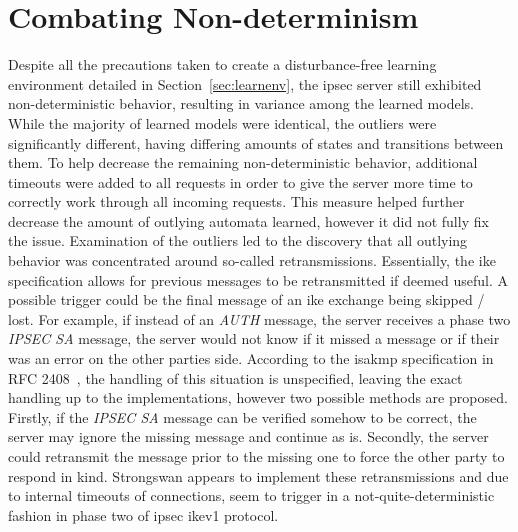 \section{Combating Non-determinism} \label{sec:nondet}
Despite all the precautions taken to create a disturbance-free learning environment detailed in Section~\ref{sec:learnenv}, the \ac{ipsec} server still exhibited non-deterministic behavior, resulting in variance among the learned models. While the majority of learned models were identical, the outliers were significantly different, having differing amounts of states and transitions between them. To help decrease the remaining non-deterministic behavior, additional timeouts were added to all requests in order to give the server more time to correctly work through all incoming requests. This measure helped further decrease the amount of outlying automata learned, however it did not fully fix the issue. Examination of the outliers led to the discovery that all outlying behavior was concentrated around so-called retransmissions. Essentially, the \ac{ike} specification allows for previous messages to be retransmitted if deemed useful. A possible trigger could be the final message of an \ac{ike} exchange being skipped / lost. For example, if instead of an \emph{AUTH} message, the server receives a phase two \emph{IPSEC SA} message, the server would not know if it missed a message or if their was an error on the other parties side. According to the \ac{isakmp} specification in RFC 2408~\cite{rfc:isakmp}, the handling of this situation is unspecified, leaving the exact handling up to the implementations, however two possible methods are proposed. Firstly, if the \emph{IPSEC SA} message can be verified somehow to be correct, the server may ignore the missing message and continue as is. Secondly, the server could retransmit the message prior to the missing one to force the other party to respond in kind. Strongswan appears to implement these retransmissions and due to internal timeouts of connections, seem to trigger in a not-quite-deterministic fashion in phase two of \ac{ipsec} \ac{ike}v1 protocol.

